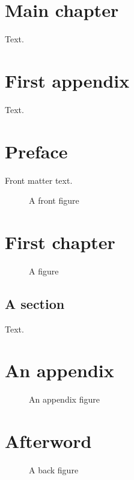 \documentclass[11pt,oneside]{memoir}
\begin{document}
\chapter{Main chapter}
Text.
\appendix
\chapter{First appendix}
Text.
\frontmatter
\chapter{Preface}
Front matter text.
\begin{figure}\caption{A front figure}\end{figure}
\mainmatter
\chapter{First chapter}
\begin{figure}\caption{A figure}\end{figure}
\section{A section}
Text.
\appendix
\chapter{An appendix}
\begin{figure}\caption{An appendix figure}\end{figure}
\backmatter
\chapter{Afterword}
\begin{figure}\caption{A back figure}\end{figure}
\end{document}
